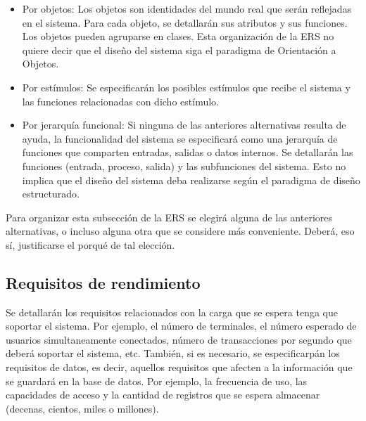 \documentclass[12pt,a4paper]{article}
\begin{document}
\begin{itemize}
\item Por objetos:
   Los objetos son identidades del mundo real que serán reflejadas en
el sistema. Para cada objeto, se detallarán sus atributos y sus
funciones. Los objetos pueden agruparse en clases. Esta organización
de la ERS no quiere decir que el diseño del sistema siga el
paradigma de Orientación a Objetos.
\end{itemize}


\begin{itemize}
\item Por estímulos: 
  Se especificarán los posibles estímulos que recibe el sistema y las
funciones relacionadas con dicho estímulo.
\end{itemize}


\begin{itemize}
\item Por jerarquía funcional: 
   Si ninguna de las anteriores alternativas resulta de ayuda, la
funcionalidad del sistema se especificará como una jerarquía de
funciones que comparten entradas, salidas o datos internos. Se
detallarán las funciones (entrada, proceso, salida) y las
subfunciones del sistema. Esto no implica que el diseño del sistema
deba realizarse según el paradigma de diseño estructurado.
\end{itemize}


Para organizar esta subsección de la ERS se elegirá alguna de las
anteriores alternativas, o incluso alguna otra que se considere más
conveniente. Deberá, eso sí, justificarse el porqué de tal elección.



\subsection{Requisitos de rendimiento}
\label{sec:performance_requirements}

Se detallarán los requisitos relacionados con la carga que se espera
tenga que soportar el sistema. Por ejemplo, el número de terminales,
el número esperado de usuarios simultaneamente conectados, número de
transacciones por segundo que deberá soportar el sistema, etc.
  También, si es necesario, se especificarpán los requisitos de
datos, es decir, aquellos requisitos que afecten a la información
que se guardará en la base de datos. Por ejemplo, la frecuencia de
uso, las capacidades de acceso y la cantidad de registros que se
espera almacenar (decenas, cientos, miles o millones).
\end{document}
